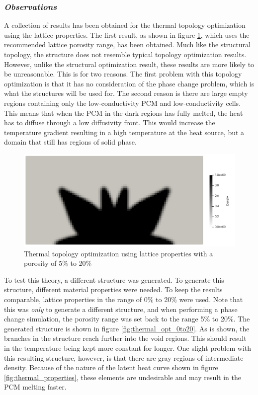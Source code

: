 \subsubsection*{\emph{Observations}}
A collection of results has been obtained for the thermal topology optimization using the lattice properties. The first result, as shown in figure \ref{fig:thermal_opt_5to20}, which uses the recommended lattice porosity range, has been obtained. Much like the structural topology, the structure does not resemble typical topology optimization results. However, unlike the structural optimization result, these results are more likely to be unreasonable. This is for two reasons. The first problem with this topology optimization is that it has no consideration of the phase change problem, which is what the structures will be used for. The second reason is there are large empty regions containing only the low-conductivity PCM and low-conductivity cells. This means that when the PCM in the dark regions has fully melted, the heat has to diffuse through a low diffusivity front. This would increase the temperature gradient resulting in a high temperature at the heat source, but a domain that still has regions of solid phase.
\begin{figure}[ht]
  \centering
  \includegraphics[width=0.85\linewidth]{figures/chapter_4/ThermalOptLattice5to20.png}
  \caption{Thermal topology optimization using lattice properties with a porosity of 5\% to 20\%}
  \label{fig:thermal_opt_5to20}
\end{figure}

To test this theory, a different structure was generated. To generate this structure, different material properties were needed. To keep the results comparable, lattice properties in the range of 0\% to 20\% were used. Note that this was \emph{only} to generate a different structure, and when performing a phase change simulation, the porosity range was set back to the range 5\% to 20\%. The generated structure is shown in figure \ref{fig:thermal_opt_0to20}. As is shown, the branches in the structure reach further into the void regions. This should result in the temperature being kept more constant for longer. One slight problem with this resulting structure, however, is that there are gray regions of intermediate density. Because of the nature of the latent heat curve shown in figure \ref{fig:thermal_properties}, these elements are undesirable and may result in the PCM melting faster.

